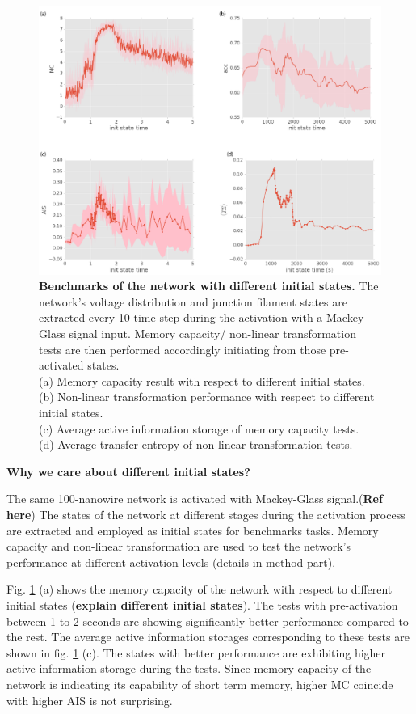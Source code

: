 \documentclass[fleqn,10pt,  amsmath,amssymb,aps]{wlscirep}
\begin{document}
\begin{figure}[]
	\centering
	\includegraphics[width=1\linewidth]{figure/benchmark.png}
	\caption{\textbf{Benchmarks of the network with different initial states.} The network's voltage distribution and junction filament states are extracted every 10 time-step during the activation with a Mackey-Glass signal input. Memory capacity/ non-linear transformation tests are then performed accordingly initiating from those pre-activated states. \\
	(a) Memory capacity result with respect to different initial states.\\
	(b) Non-linear transformation performance with respect to different initial states.\\
	(c) Average active information storage of memory capacity tests.\\
	(d) Average transfer entropy of non-linear transformation tests.} 
	\label{fig:benchmark}
\end{figure}


\textbf{Why we care about different initial states?} 

The same 100-nanowire network is activated with Mackey-Glass signal.(\textbf{Ref here}) The states of the network at different stages during the activation process are extracted and employed as initial states for benchmarks tasks. Memory capacity and non-linear transformation are used to test the network's performance at different activation levels (details in method part). 

Fig. \ref{fig:benchmark} (a) shows the memory capacity of the network with respect to different initial states (\textbf{explain different initial states}). The tests with pre-activation between 1 to 2 seconds are showing significantly better performance compared to the rest. The average active information storages corresponding to these tests are shown in fig. \ref{fig:benchmark} (c). The states with better performance are exhibiting higher active information storage during the tests. Since memory capacity of the network is indicating its capability of short term memory, higher MC coincide with higher AIS is not surprising.
\end{document}
